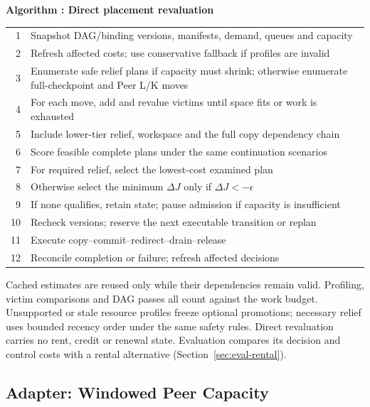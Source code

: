 \par\medskip\noindent\begin{minipage}{\columnwidth}
\raggedright
 \label{alg:placement}
 \textbf{Algorithm \thedesignalgorithm: Direct placement revaluation}
 \par\smallskip
 \begin{tabularx}{\columnwidth}{@{}r@{\quad}X@{}}
 \toprule
 1 & Snapshot DAG/binding versions, manifests, demand, queues and capacity \\
 2 & Refresh affected costs; use conservative fallback if profiles are invalid \\
 3 & Enumerate safe relief plans if capacity must shrink; otherwise enumerate full-checkpoint and Peer L/K moves \\
 4 & For each move, add and revalue victims until space fits or work is exhausted \\
 5 & Include lower-tier relief, workspace and the full copy dependency chain \\
 6 & Score feasible complete plans under the same continuation scenarios \\
 7 & For required relief, select the lowest-cost examined plan \\
 8 & Otherwise select the minimum $\Delta J$ only if $\Delta J<-\epsilon$ \\
 9 & If none qualifies, retain state; pause admission if capacity is insufficient \\
 10 & Recheck versions; reserve the next executable transition or replan \\
 11 & Execute copy--commit--redirect--drain--release \\
 12 & Reconcile completion or failure; refresh affected decisions \\
 \bottomrule
 \end{tabularx}
\end{minipage}\par\medskip

Cached estimates are reused only while their dependencies remain valid.
Profiling, victim comparisons and DAG passes all count against the work
budget. Unsupported or stale resource profiles freeze optional promotions;
necessary relief uses bounded recency order under the same safety rules.
Direct revaluation carries no rent, credit or renewal state. Evaluation
compares its decision and control costs with a rental alternative
(Section~\ref{sec:eval-rental}).

\subsection{Adapter: Windowed Peer Capacity}
\label{sec:adapter}


